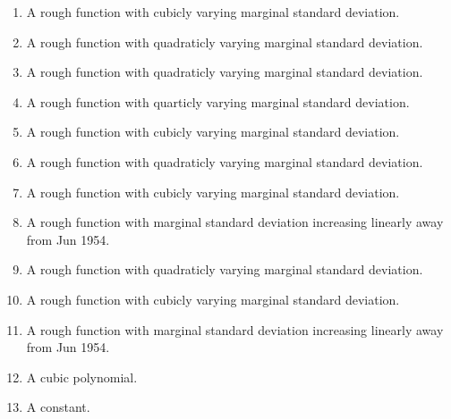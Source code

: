 \documentclass[11pt,a4paper]{article}
\begin{document}
\begin{enumerate}
  \item A rough function with cubicly varying marginal standard deviation.
  \item A rough function with quadraticly varying marginal standard deviation.
  \item A rough function with quadraticly varying marginal standard deviation.
  \item A rough function with quarticly varying marginal standard deviation.
  \item A rough function with cubicly varying marginal standard deviation.
  \item A rough function with quadraticly varying marginal standard deviation.
  \item A rough function with cubicly varying marginal standard deviation.
  \item A rough function with marginal standard deviation increasing linearly away from Jun 1954.
  \item A rough function with quadraticly varying marginal standard deviation.
  \item A rough function with cubicly varying marginal standard deviation.
  \item A rough function with marginal standard deviation increasing linearly away from Jun 1954.
  \item A cubic polynomial.
  \item A constant.
\end{enumerate}
\end{document}
